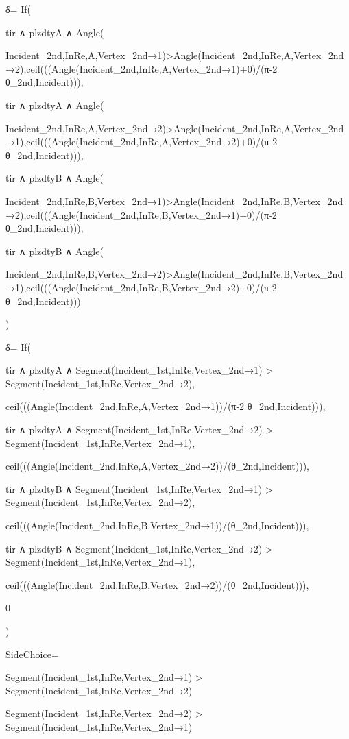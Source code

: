 δ=
  If(

    tir ∧ plzdtyA ∧ Angle(

      Incident_{2nd,InRe},A,Vertex_{2nd→1})>Angle(Incident_{2nd,InRe},A,Vertex_{2nd→2}),ceil(((Angle(Incident_{2nd,InRe},A,Vertex_{2nd→1})+0)/(π-2 θ_{2nd,Incident}))),

    tir ∧ plzdtyA ∧ Angle(
      
      Incident_{2nd,InRe},A,Vertex_{2nd→2})>Angle(Incident_{2nd,InRe},A,Vertex_{2nd→1}),ceil(((Angle(Incident_{2nd,InRe},A,Vertex_{2nd→2})+0)/(π-2 θ_{2nd,Incident}))),

    tir ∧ plzdtyB ∧ Angle(

      Incident_{2nd,InRe},B,Vertex_{2nd→1})>Angle(Incident_{2nd,InRe},B,Vertex_{2nd→2}),ceil(((Angle(Incident_{2nd,InRe},B,Vertex_{2nd→1})+0)/(π-2 θ_{2nd,Incident}))),

    tir ∧ plzdtyB ∧ Angle(

      Incident_{2nd,InRe},B,Vertex_{2nd→2})>Angle(Incident_{2nd,InRe},B,Vertex_{2nd→1}),ceil(((Angle(Incident_{2nd,InRe},B,Vertex_{2nd→2})+0)/(π-2 θ_{2nd,Incident})))

    )

  δ=
    If(

      tir ∧ plzdtyA ∧ Segment(Incident_{1st,InRe},Vertex_{2nd→1}) > Segment(Incident_{1st,InRe},Vertex_{2nd→2}),

      ceil(((Angle(Incident_{2nd,InRe},A,Vertex_{2nd→1}))/(π-2 θ_{2nd,Incident}))),
      
      tir ∧ plzdtyA ∧ Segment(Incident_{1st,InRe},Vertex_{2nd→2}) > Segment(Incident_{1st,InRe},Vertex_{2nd→1}),
      
      ceil(((Angle(Incident_{2nd,InRe},A,Vertex_{2nd→2}))/(θ_{2nd,Incident}))),
      
      tir ∧ plzdtyB ∧ Segment(Incident_{1st,InRe},Vertex_{2nd→1}) > Segment(Incident_{1st,InRe},Vertex_{2nd→2}),
      
      ceil(((Angle(Incident_{2nd,InRe},B,Vertex_{2nd→1}))/(θ_{2nd,Incident}))),
      
      tir ∧ plzdtyB ∧ Segment(Incident_{1st,InRe},Vertex_{2nd→2}) > Segment(Incident_{1st,InRe},Vertex_{2nd→1}),
      
      ceil(((Angle(Incident_{2nd,InRe},B,Vertex_{2nd→2}))/(θ_{2nd,Incident}))),

      0
      
    )   

  SideChoice=

      Segment(Incident_{1st,InRe},Vertex_{2nd→1}) > Segment(Incident_{1st,InRe},Vertex_{2nd→2})

      Segment(Incident_{1st,InRe},Vertex_{2nd→2}) > Segment(Incident_{1st,InRe},Vertex_{2nd→1})